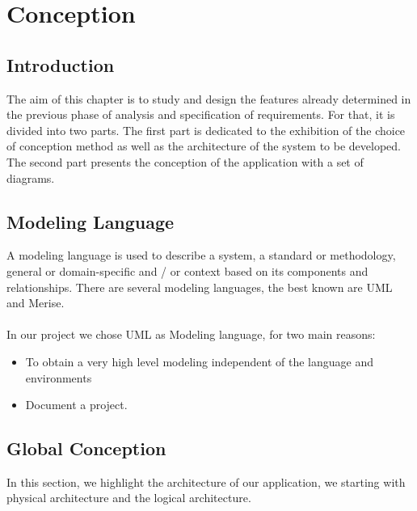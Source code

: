 
	\chapter{Conception}
	
	\section{Introduction}
	The aim of this chapter is  to study and design the features already determined in the previous phase of analysis and specification of requirements. For that, it is divided into two parts. The first part is dedicated to the exhibition of the choice of conception method as well as the architecture of the system to be developed. The second part presents the conception of the application with a set of diagrams.
	\section{Modeling Language}
		A modeling language is used to describe a system, a standard or methodology, general or domain-specific and / or context based on its components and relationships.
	There are several modeling languages, the best known are UML and Merise.
	\\
	\\
	In our project we chose UML as Modeling language, for two main reasons: 
	\begin{itemize}
	\item To obtain a very high level modeling independent of the language and environments
	\item Document a project. 
	\end{itemize}
	
	\section{Global Conception}
	In this section, we highlight the architecture of our application, we starting  with physical architecture and the logical architecture.
	
	\clearpage
	\newpage
